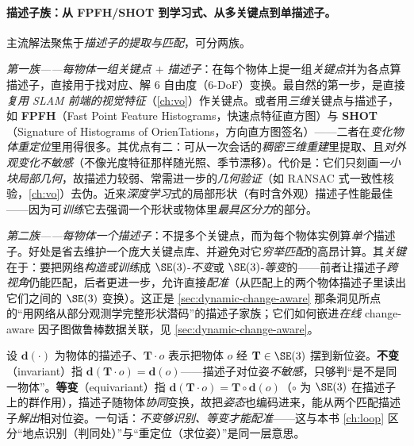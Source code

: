 \paragraph{描述子族：从 FPFH/SHOT 到学习式、从多关键点到单描述子。}
主流解法聚焦于\emph{描述子的提取与匹配}\cite{schmid2026dynamic}，可分两族。

\emph{第一族——每物体一组关键点 $+$ 描述子}：在每个物体上提一组\emph{关键点}并为各点算描述子，直接用于找对应、解 6 自由度（6-DoF）变换。最自然的第一步，是直接\emph{复用 SLAM 前端的视觉特征}（\cref{ch:vo}）作关键点。或者用\emph{三维}关键点与描述子，如 \textbf{FPFH}（Fast Point Feature Histograms，快速点特征直方图）与 \textbf{SHOT}（Signature of Histograms of OrienTations，方向直方图签名）——二者在\emph{变化物体重定位}里用得很多。其优点有二：可从一次会话的\emph{稠密三维重建}里提取、且\emph{对外观变化不敏感}（不像光度特征那样随光照、季节漂移）。代价是：它们只刻画\emph{一小块局部几何}，故描述力较弱、常需进一步的\emph{几何验证}（如 RANSAC 式一致性核验，\cref{ch:vo}）去伪。近来\emph{深度学习}式的局部形状（有时含外观）描述子性能最佳——因为可\emph{训练}它去强调一个形状或物体里\emph{最具区分力}的部分。

\emph{第二族——每物体一个描述子}：不提多个关键点，而为每个物体实例算\emph{单个}描述子\cite{schmid2026dynamic}。好处是省去维护一个庞大关键点库、并避免对它\emph{穷举匹配}的高昂计算。其\emph{关键}在于：要把网络\emph{构造或训练}成 $\SE(3)$-\emph{不变}或 $\SE(3)$-\emph{等变}的——前者让描述子\emph{跨视角}仍能匹配，后者更进一步，允许直接\emph{配准}（从匹配上的两个物体描述子里读出它们之间的 $\SE(3)$ 变换）。这正是 \cref{sec:dynamic-change-aware} 那条洞见所点的“用网络从部分观测学完整形状潜码”的描述子家族；它们如何嵌进\emph{在线} change-aware 因子图做鲁棒数据关联，见 \cref{sec:dynamic-change-aware}。

\begin{note}
设 $\mathbf{d}(\cdot)$ 为物体的描述子、$\mathbf{T}\!\cdot\! o$ 表示把物体 $o$ 经 $\mathbf{T}\in\SE(3)$ 摆到新位姿。\textbf{不变}（invariant）指 $\mathbf{d}(\mathbf{T}\!\cdot\! o)=\mathbf{d}(o)$——描述子对位姿\emph{不敏感}，只够判“是不是同一物体”。\textbf{等变}（equivariant）指 $\mathbf{d}(\mathbf{T}\!\cdot\! o)=\mathbf{T}\!\circ\!\mathbf{d}(o)$（$\circ$ 为 $\SE(3)$ 在描述子上的群作用），描述子随物体\emph{协同}变换，故把\emph{姿态}也编码进来，能从两个匹配描述子\emph{解出}相对位姿。一句话：\emph{不变够识别、等变才能配准}——这与本书 \cref{ch:loop} 区分“地点识别（判同处）”与“重定位（求位姿）”是同一层意思。
\end{note}

